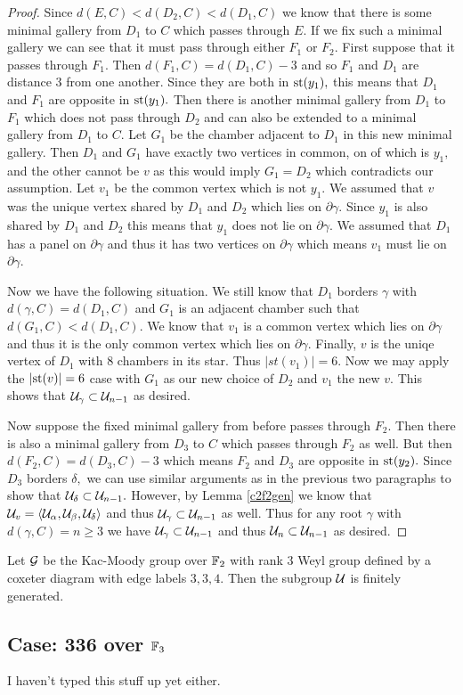 \documentclass[class=book, crop=false]{standalone}
\begin{document}
\begin{proof}
Since $d(E,C)<d(D_2,C)<d(D_1,C)$ we know that there is some minimal gallery from $D_1$ to $C$ which passes through $E.$ If we fix such a minimal gallery we can see that it must pass through either $F_1$ or $F_2.$ First suppose that it passes through $F_1.$ Then $d(F_1,C)=d(D_1,C)-3$ and so $F_1$ and $D_1$ are distance 3 from one another. Since they are both in $\mathrm{st}(y_1),$ this means that $D_1$ and $F_1$ are opposite in $\mathrm{st}(y_1).$ Then there is another minimal gallery from $D_1$ to $F_1$ which does not pass through $D_2$ and can also be extended to a minimal gallery from $D_1$ to $C.$ Let $G_1$ be the chamber adjacent to $D_1$ in this new minimal gallery. Then $D_1$ and $G_1$ have exactly two vertices in common, on of which is $y_1,$ and the other cannot be $v$ as this would imply $G_1=D_2$ which contradicts our assumption. Let $v_1$ be the common vertex which is not $y_1.$ We assumed that $v$ was the unique vertex shared by $D_1$ and $D_2$ which lies on $\partial \gamma.$ Since $y_1$ is also shared by $D_1$ and $D_2$ this means that $y_1$ does not lie on $\partial \gamma.$ We assumed that $D_1$ has a panel on $\partial \gamma$ and thus it has two vertices on $\partial \gamma$ which means $v_1$ must lie on $\partial \gamma.$

Now we have the following situation. We still know that $D_1$ borders $\gamma$ with $d(\gamma,C)=d(D_1,C)$ and $G_1$ is an adjacent chamber such that $d(G_1,C)<d(D_1,C).$ We know that $v_1$ is a common vertex which lies on $\partial\gamma$ and thus it is the only common vertex which lies on $\partial\gamma.$ Finally, $v$ is the uniqe vertex of $D_1$ with 8 chambers in its star. Thus $|st(v_1)|=6.$ Now we may apply the $|\mathrm{st}(v)|=6$ case with $G_1$ as our new choice of $D_2$ and $v_1$ the new $v.$ This shows that $\mathcal{U}_\gamma\subset \mathcal{U}_{n-1}$ as desired.

Now suppose the fixed minimal gallery from before passes through $F_2.$ Then there is also a minimal gallery from $D_3$ to $C$ which passes through $F_2$ as well. But then $d(F_2,C)=d(D_3,C)-3$ which means $F_2$ and $D_3$ are opposite in $\mathrm{st}(y_2).$ Since $D_3$ borders $\delta,$ we can use similar arguments as in the previous two paragraphs to show that $\mathcal{U}_\delta\subset \mathcal{U}_{n-1}.$ However, by Lemma \ref{c2f2gen} we know that $\mathcal{U}_v=\langle \mathcal{U}_\alpha,\mathcal{U}_\beta,\mathcal{U}_\delta\rangle$ and thus $\mathcal{U}_\gamma\subset \mathcal{U}_{n-1}$ as well. Thus for any root $\gamma$ with $d(\gamma,C)=n\ge 3$ we have $\mathcal{U}_\gamma\subset \mathcal{U}_{n-1}$ and thus $\mathcal{U}_n\subset \mathcal{U}_{n-1}$ as desired.
\end{proof}

\begin{cor}
	Let $\mathcal{G}$ be the Kac-Moody group over $\mathbb{F}_{2}$ with rank 3 Weyl group defined by a coxeter diagram with edge labels $3,3,4.$ Then the subgroup $\mathcal{U}$ is finitely generated.
\end{cor}

\subsection{Case: 336 over $\mathbb{F}_{3}$}
I haven't typed this stuff up yet either.
\end{document}
